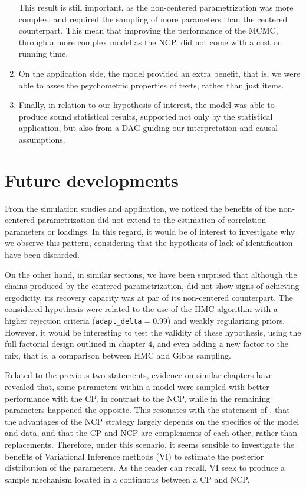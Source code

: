 \begin{enumerate}
	This result is still important, as the non-centered parametrization was more complex, and required the sampling of more parameters than the centered counterpart. This mean that improving the performance of the MCMC, through a more complex model as the NCP, did not come with a cost on running time.
	\item On the application side, the model provided an extra benefit, that is, we were able to asses the psychometric properties of texts, rather than just items.
	\item Finally, in relation to our hypothesis of interest, the model was able to produce sound statistical results, supported not only by the statistical application, but also from a DAG guiding our interpretation and causal assumptions.
\end{enumerate}


\section{Future developments}

From the simulation studies and application, we noticed the benefits of the non-centered parametrization did not extend to the estimation of correlation parameters or loadings. In this regard, it would be of interest to investigate why we observe this pattern, considering that the hypothesis of lack of identification have been discarded.

On the other hand, in similar sections, we have been surprised that although the chains produced by the centered parametrization, did not show signs of achieving ergodicity, its recovery capacity was at par of its non-centered counterpart. The considered hypothesis were related to the use of the HMC algorithm with a higher rejection criteria (\texttt{adapt\_delta}$=0.99$) and weakly regularizing priors. However, it would be interesting to test the validity of these hypothesis, using the full factorial design outlined in chapter $4$, and even adding a new factor to the mix, that is, a comparison between HMC and Gibbs sampling.

Related to the previous two statements, evidence on similar chapters have revealed that, some parameters within a model were sampled with better performance with the CP, in contrast to the NCP, while in the remaining parameters happened the opposite. This resonates with the statement of \citet{Papaspiliopoulos_et_al_2007}, that the advantages of the NCP strategy largely depends on the specifics of the model and data, and that the CP and NCP are complements of each other, rather than replacements. Therefore, under this scenario, it seems sensible to investigate the benefits of Variational Inference methods (VI) to estimate the posterior distribution of the parameters. As the reader can recall, VI seek to produce a sample mechanism located in a continuous between a CP and NCP.

